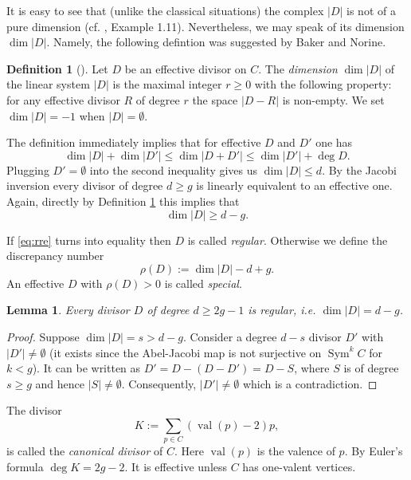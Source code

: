\documentclass[12pt]{amsart}
\theoremstyle{plain}
\newtheorem{lemma}[theorem]{Lemma}
\theoremstyle{definition}
\newtheorem{definition}[theorem]{Definition}
\theoremstyle{remark}
\newcommand{\<}{\langle}   %
\renewcommand{\>}{\rangle} %
\newcommand{\Sym}{\operatorname{Sym}}
\newcommand{\val}{\operatorname{val}}
\begin{document}
It is easy to see that (unlike the classical situations) the complex $|D|$ is not
of a pure dimension (cf. \cite{GK}, Example 1.11).
Nevertheless, we may speak of its dimension $\dim|D|$.
Namely, the following defintion was suggested by Baker and Norine.
\begin{definition} [\cite{BN}]\label{BNdef}
Let $D$ be an effective divisor on $C$.
The {\em dimension} $\dim |D|$ of the linear system $|D|$
is the maximal integer $r\geq 0$ with the following property:
for any effective divisor $R$ of degree $r$ the space $|D-R|$ is non-empty.
We set $\dim |D|=-1$ when $|D|=\emptyset$.
\end{definition}


The definition immediately implies that for effective $D$ and $D'$ one has
\begin{equation}\label{eq:sumdegree}
\dim|D|+\dim|D'| \leq \dim|D+D'| \leq \dim|D'|+\deg D.
\end{equation}
Plugging $D'=\emptyset$ into the second inequality gives us $\dim|D| \leq d$.
By the Jacobi inversion every divisor of degree $d\geq g$ is linearly equivalent to an effective one.
Again, directly by Definition \ref{BNdef} this implies that
\begin{equation}\label{eq:rre}
\dim|D|\geq d-g.
\end{equation}

If \eqref{eq:rre} turns into equality
then $D$ is called {\em regular}.
Otherwise we define the discrepancy number
$$\rho(D):= \dim|D| - d+g.
$$
An effective $D$ with $\rho(D) >0$ is called  {\em special}.

\begin{lemma}\label{lemma:2g-1}
Every divisor $D$ of degree $d\geq 2g-1$ is regular, i.e. $\dim|D| = d-g$.
\end{lemma}
\begin{proof}
Suppose $\dim|D|=s > d-g$.
Consider a degree $d-s$ divisor $D'$ with $|D'|\ne\emptyset$
(it exists since the Abel-Jacobi map is not surjective
on $\Sym^k C$ for  $k < g$).
It can be written as $D'=D-(D-D')=D-S$,
where $S$ is of degree $s \geq g$ and hence $|S|\ne\emptyset$.
Consequently, $|D'|\ne\emptyset$ which is a contradiction.
\end{proof}

The divisor
\begin{equation}\label{eq:canonical}
K:=\sum_{p\in C} (\val(p)-2)p,
\end{equation}
is called the {\em canonical divisor} of $C$. Here $\val(p)$ is the valence of $p$. By Euler's formula $\deg K=2g-2$. It is effective unless $C$ has one-valent vertices.
\end{document}
